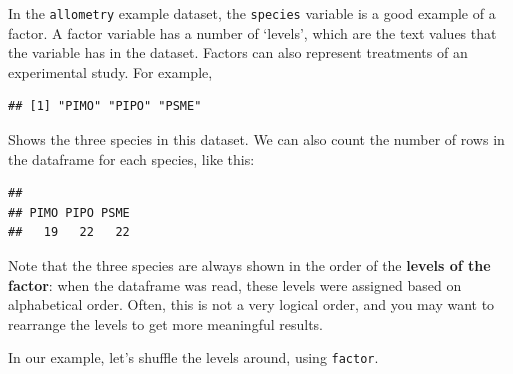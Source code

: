 \documentclass[]{book}
\newenvironment{Shaded}{\begin{snugshade}}{\end{snugshade}}
\newcommand{\DataTypeTok}[1]{\textcolor[rgb]{0.13,0.29,0.53}{#1}}
\newcommand{\KeywordTok}[1]{\textcolor[rgb]{0.13,0.29,0.53}{\textbf{#1}}}
\newcommand{\NormalTok}[1]{#1}
\newcommand{\OperatorTok}[1]{\textcolor[rgb]{0.81,0.36,0.00}{\textbf{#1}}}
\newcommand{\StringTok}[1]{\textcolor[rgb]{0.31,0.60,0.02}{#1}}
\begin{document}
In the \texttt{allometry} example dataset, the \texttt{species} variable is a good example of a factor. A factor variable has a number of `levels', which are the text values that the variable has in the dataset. Factors can also represent treatments of an experimental study. For example,

\begin{Shaded}
\end{Shaded}

\begin{verbatim}
## [1] "PIMO" "PIPO" "PSME"
\end{verbatim}

Shows the three species in this dataset. We can also count the number of rows in the dataframe for each species, like this:

\begin{Shaded}
\end{Shaded}

\begin{verbatim}
## 
## PIMO PIPO PSME 
##   19   22   22
\end{verbatim}

Note that the three species are always shown in the order of the \textbf{levels of the factor}: when the dataframe was read, these levels were assigned based on alphabetical order. Often, this is not a very logical order, and you may want to rearrange the levels to get more meaningful results.

In our example, let's shuffle the levels around, using \texttt{factor}.

\begin{Shaded}
\end{Shaded}
\end{document}
